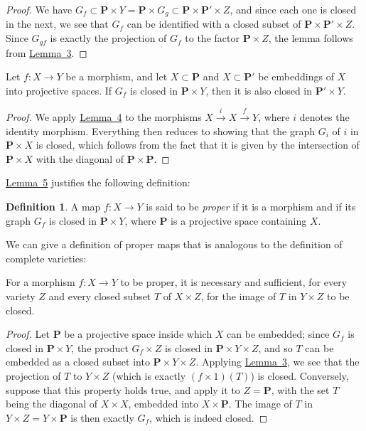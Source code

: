 \documentclass{article}
\theoremstyle{plain}
\newenvironment{proposition}[1]
    {\renewcommand\theinnerproposition{#1}\innerproposition}
    {\endinnerproposition}
\newenvironment{lemma}[1]
    {\renewcommand\theinnerlemma{#1}\innerlemma}
    {\endinnerlemma}
\theoremstyle{definition}
\newtheorem*{definition}{Definition}
\newcommand{\PP}{\mathbf{P}}
\newcommand{\oldpage}[1]{\marginpar{\footnotesize$\Big\vert$ \textit{p.~#1}}}
\begin{document}
\begin{proof}
  We have $G_f \subset \PP\times Y = \PP\times G_g \subset \PP\times \PP'\times Z$, and since each one is closed in the next, we see that $G_f$ can be identified with a closed subset of $\PP\times \PP'\times Z$.
  Since $G_{gf}$ is exactly the projection of $G_f$ to the factor $\PP\times Z$, the lemma follows from \hyperref[lemma3]{Lemma~3}.
\end{proof}

\begin{lemma}{5}
\label{lemma5}
  Let $f\colon X\to Y$ be a morphism, and let $X\subset \PP$ and $X\subset \PP'$ be embeddings of $X$ into projective spaces.
  If $G_f$ is closed in $\PP\times Y$, then it is also closed in $\PP'\times Y$.
\end{lemma}

\begin{proof}
  We apply \hyperref[lemma4]{Lemma~4} to the morphisms $X\xrightarrow{i}X\xrightarrow{f}Y$, where $i$ denotes the identity morphism.
  Everything then reduces to showing that the graph $G_i$ of $i$ in $\PP\times X$ is closed, which follows from the fact that it is given by the intersection of $\PP\times X$ with the diagonal of $\PP\times \PP$.
\end{proof}

\hyperref[lemma5]{Lemma~5} justifies the following definition:

\begin{definition}
  A map $f\colon X\to Y$ is said to be \emph{proper} if it is a morphism and if its graph $G_f$ is closed in $\PP\times Y$, where $\PP$ is a projective space containing $X$.
\end{definition}

We can give a definition of proper maps that is analogous to the definition of complete varieties:

\begin{proposition}{3}
\label{proposition3}
  For a morphism $f\colon X\to Y$ to be proper, it is necessary and sufficient, for every variety $Z$ and every closed subset $T$ of $X\times Z$, for the image of $T$ in $Y\times Z$ to be closed.
\end{proposition}

\begin{proof}
  Let $\PP$ be a projective space inside which $X$ can be embedded;
  since $G_f$ is closed in $\PP\times Y$, the product $G_f\times Z$ is closed in $\PP\times Y\times Z$, and so $T$ can be embedded as a closed subset into $\PP\times Y\times Z$.
\oldpage{101}
  Applying \hyperref[lemma3]{Lemma~3}, we see that the projection of $T$ to $Y\times Z$ (which is exactly $(f\times1)(T)$) is closed.
  Conversely, suppose that this property holds true, and apply it to $Z=\PP$, with the set $T$ being the diagonal of $X\times X$, embedded into $X\times \PP$.
  The image of $T$ in $Y\times Z=Y\times \PP$ is then exactly $G_f$, which is indeed closed.
\end{proof}
\end{document}

